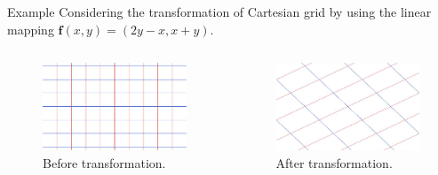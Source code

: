 \begin{frame}{Example}
    Considering the transformation of Cartesian grid by using the linear mapping $\mathbf f(x,y) = (2y-x,x+y)$.
    \begin{columns}
        \begin{column}{0.5\textwidth}
            \begin{figure}[h!]
                \includegraphics[width=0.95\linewidth]{figures/Grid.jpg}
                \caption{Before transformation.}
                \label{fig:example-astatic-knowledge-graph}
            \end{figure}
        \end{column}
        \begin{column}{0.5\textwidth}  %
            \begin{figure}[h!]
                \includegraphics[width=0.95\linewidth]{figures/linear_after.jpg}
                \caption{After transformation.}
                \label{fig:example-astatic-knowledge-graph}
            \end{figure}
        \end{column}
    \end{columns}
\end{frame}

